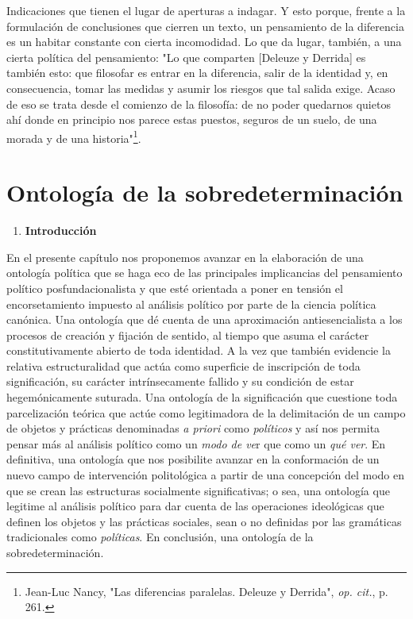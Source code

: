 \documentclass{book}
\begin{document}
Indicaciones que tienen el lugar de aperturas a indagar. Y esto porque,
frente a la formulación de conclusiones que cierren un texto, un
pensamiento de la diferencia es un habitar constante con cierta
incomodidad. Lo que da lugar, también, a una cierta política del
pensamiento: "Lo que comparten {[}Deleuze y Derrida{]} es también esto:
que filosofar es entrar en la diferencia, salir de la identidad y, en
consecuencia, tomar las medidas y asumir los riesgos que tal salida
exige. Acaso de eso se trata desde el comienzo de la filosofía: de no
poder quedarnos quietos ahí donde en principio nos parece estas puestos,
seguros de un suelo, de una morada y de una historia"\footnote{Jean-Luc
  Nancy, "Las diferencias paralelas. Deleuze y Derrida", \emph{op.
  cit.}, p. 261.}.

\chapter{Ontología de la sobredeterminación}

\author{Andrés Daín}

\begin{enumerate}
\def\labelenumi{\arabic{enumi}.}
\item
  \textbf{Introducción}
\end{enumerate}

En el presente capítulo nos proponemos avanzar en la elaboración de una
ontología política que se haga eco de las principales implicancias del
pensamiento político posfundacionalista y que esté orientada a poner en
tensión el encorsetamiento impuesto al análisis político por parte de la
ciencia política canónica. Una ontología que dé cuenta de una
aproximación antiesencialista a los procesos de creación y fijación de
sentido, al tiempo que asuma el carácter constitutivamente abierto de
toda identidad. A la vez que también evidencie la relativa
estructuralidad que actúa como superficie de inscripción de toda
significación, su carácter intrínsecamente fallido y su condición de
estar hegemónicamente suturada. Una ontología de la significación que
cuestione toda parcelización teórica que actúe como legitimadora de la
delimitación de un campo de objetos y prácticas denominadas \emph{a
priori} como \emph{políticos} y así nos permita pensar más al análisis
político como un \emph{modo de ve}r que como un \emph{qué ver}. En
definitiva, una ontología que nos posibilite avanzar en la conformación
de un nuevo campo de intervención politológica a partir de una
concepción del modo en que se crean las estructuras socialmente
significativas; o sea, una ontología que legitime al análisis político
para dar cuenta de las operaciones ideológicas que definen los objetos y
las prácticas sociales, sean o no definidas por las gramáticas
tradicionales como \emph{políticas}. En conclusión, una ontología de la
sobredeterminación.
\end{document}
